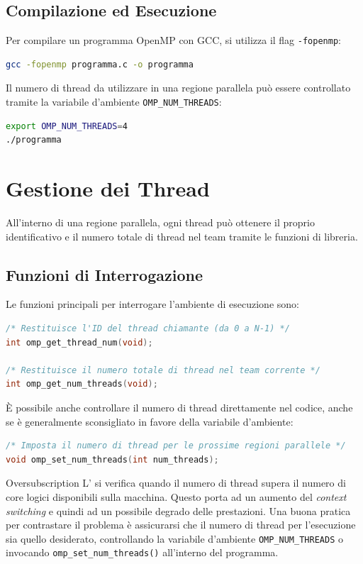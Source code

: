 \subsection{Compilazione ed Esecuzione}
Per compilare un programma OpenMP con GCC, si utilizza il flag \texttt{-fopenmp}:
\begin{lstlisting}[language=bash, numbers=none]
gcc -fopenmp programma.c -o programma
\end{lstlisting}
Il numero di thread da utilizzare in una regione parallela può essere controllato tramite la variabile d'ambiente \texttt{OMP\_NUM\_THREADS}:
\begin{lstlisting}[language=bash, numbers=none]
export OMP_NUM_THREADS=4
./programma
\end{lstlisting}

\section{Gestione dei Thread}
All'interno di una regione parallela, ogni thread può ottenere il proprio identificativo e il numero totale di thread nel team tramite le funzioni di libreria.

\subsection{Funzioni di Interrogazione}
Le funzioni principali per interrogare l'ambiente di esecuzione sono:
\begin{lstlisting}[language=C, numbers=none]
/* Restituisce l'ID del thread chiamante (da 0 a N-1) */
int omp_get_thread_num(void);

/* Restituisce il numero totale di thread nel team corrente */
int omp_get_num_threads(void);
\end{lstlisting}

È possibile anche controllare il numero di thread direttamente nel codice, anche se è generalmente sconsigliato in favore della variabile d'ambiente:
\begin{lstlisting}[language=C, numbers=none]
/* Imposta il numero di thread per le prossime regioni parallele */
void omp_set_num_threads(int num_threads);
\end{lstlisting}

\begin{warning}{Oversubscription}
    L' si verifica quando il numero di thread supera il numero di core logici disponibili sulla macchina. 
    Questo porta ad un aumento del \emph{context switching} e quindi ad un possibile degrado delle prestazioni. 
    Una buona pratica per contrastare il problema è assicurarsi che il numero di thread per l'esecuzione sia quello desiderato, controllando la variabile d'ambiente \texttt{OMP\_NUM\_THREADS} o invocando \texttt{omp\_set\_num\_threads()} all'interno del programma.
\end{warning}

